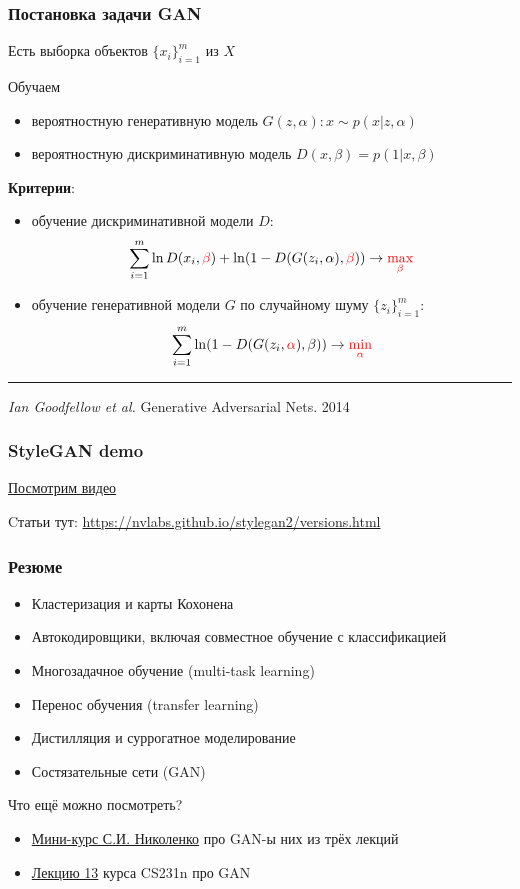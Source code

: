 \documentclass[fullscreen=true, bookmarks=true, hyperref={pdfencoding=unicode}]{beamer}
\begin{document}
\begin{frame}
  \frametitle{Постановка задачи GAN}

  Есть выборка объектов $\{x_i\}_{i=1}^m$ из $X$

  Обучаем

  \begin{itemize}
    \item вероятностную генеративную модель $G(z, \alpha): x \sim p(x|z,\alpha)$
    \item вероятностную дискриминативную модель $D(x, \beta) = p(1| x, \beta)$
  \end{itemize}

  {\bf Критерии}:
  \begin{itemize}
    \item обучение дискриминативной модели $D$:
      $$ \sum\limits_{i=1}^m \ln D(x_i, {\color{red}\beta}) + \ln(1 - D(G(z_i, \alpha), {\color{red}\beta})) \to {\color{red}\max\limits_{\beta}}$$
    \item обучение генеративной модели $G$ по случайному шуму $\{z_i\}_{i=1}^m$:
      $$ \sum\limits_{i=1}^m \ln(1 - D(G(z_i, {\color{red}\alpha}), \beta)) \to {\color{red}\min\limits_{\alpha}}$$
  \end{itemize}

  \noindent\rule{8cm}{0.4pt}

  {\small
  {\it Ian Goodfellow et al.} Generative Adversarial Nets. 2014}
\end{frame}


\begin{frame}
  \frametitle{StyleGAN demo}

  \href{https://www.youtube.com/watch?v=kSLJriaOumA}{Посмотрим видео}

  \vspace{2cm}
  Cтатьи тут: \href{https://nvlabs.github.io/stylegan2/versions.html}{https://nvlabs.github.io/stylegan2/versions.html}

\end{frame}

\begin{frame}
  \frametitle{Резюме}
  \begin{itemize}
    \item Кластеризация и карты Кохонена
    \item Автокодировщики, включая совместное обучение с классификацией
    \item Многозадачное обучение (multi-task learning)
    \item Перенос обучения (transfer learning)
    \item Дистилляция и суррогатное моделирование
    \item Состязательные сети (GAN)
  \end{itemize}
  \pause
  \vspace{1cm}
  Что ещё можно посмотреть?
  \begin{itemize}
    \item  \href{https://www.lektorium.tv/node/36609}{Мини-курс С.И. Николенко} про GAN-ы них из трёх лекций
    \item \href{https://www.youtube.com/watch?v=5WoItGTWV54}{Лекцию 13} курса CS231n про GAN
  \end{itemize}
\end{frame}
\end{document}
